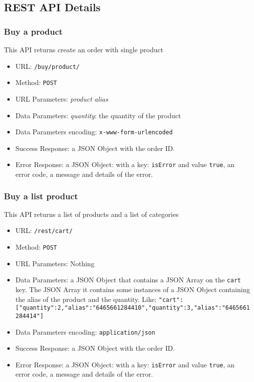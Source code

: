 \subsection{REST API Details}


\subsubsection*{Buy a product}

This API returns create an order with single product

\begin{itemize}
    \item URL: \texttt{/buy/product/}
    \item Method: \texttt{POST}
    \item URL Parameters: \textit{product alias}
    \item Data Parameters: \textit{quantity}: the quantity of the product
    \item Data Parameters encoding: \texttt{x-www-form-urlencoded}
    \item Success Response: a JSON Object with the order ID.
    \item Error Response: a JSON Object: with a key: \texttt{isError}  and value \texttt{true}, an error code, a message and details of the error.

\end{itemize}

\subsubsection*{Buy a list product}

This API returns a list of products and a list of categories

\begin{itemize}
    \item URL: \texttt{/rest/cart/}
    \item Method: \texttt{POST}
    \item URL Parameters: Nothing
    \item Data Parameters: a JSON Object that contains a JSON Array on the \texttt{cart} key. The JSON Array it contains some instances of a JSON Object  containing the alias of the product and the quantity. Like:
    \texttt{{"cart":[{"quantity":2,"alias":"6465661284410"},{"quantity":3,"alias":"6465661284414"}]}}
    \item Data Parameters encoding: \texttt{application/json}
    \item Success Response:  a JSON Object with the order ID.
    \item Error Response: a JSON Object: with a key: \texttt{isError}  and value \texttt{true}, an error code, a message and details of the error.

\end{itemize}

